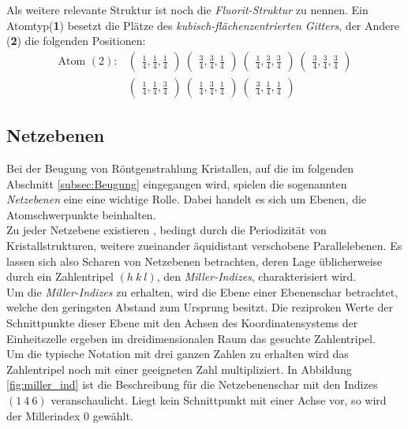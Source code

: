 Als weitere relevante Struktur ist noch die
\textit{Fluorit-Struktur} zu nennen.
Ein Atomtyp(\textbf{1}) besetzt die Plätze des
\textit{kubisch-flächenzentrierten Gitters},
der Andere (\textbf{2}) die folgenden
Positionen:
\begin{align}
\label{eqn:9*}
\text{Atom }(2) :&
\begin{pmatrix}
\frac{1}{4}, \frac{1}{4}, \frac{1}{4}
\end{pmatrix}\
\begin{pmatrix}
\frac{3}{4}, \frac{3}{4}, \frac{1}{4}
\end{pmatrix}\
\begin{pmatrix}
\frac{1}{4}, \frac{3}{4}, \frac{3}{4}
\end{pmatrix}\
\begin{pmatrix}
\frac{3}{4}, \frac{3}{4}, \frac{3}{4}
\end{pmatrix}\\
&\begin{pmatrix}
\frac{1}{4}, \frac{1}{4}, \frac{3}{4}
\end{pmatrix}\
\begin{pmatrix}
\frac{1}{4}, \frac{3}{4}, \frac{1}{4}
\end{pmatrix}\
\begin{pmatrix}
\frac{3}{4}, \frac{1}{4}, \frac{1}{4}
\end{pmatrix}\
\end{align}

\subsection{Netzebenen}
\label{subsec:netzebenen}
Bei der Beugung von Röntgenstrahlung Kristallen,
auf die im folgenden Abschnitt \ref{subsec:Beugung}
eingegangen wird, spielen die sogenannten \textit{Netzebenen}
eine eine wichtige Rolle. Dabei handelt es sich
um Ebenen, die Atomschwerpunkte beinhalten.\\
Zu jeder Netzebene existieren , bedingt durch die
Periodizität von Kristallstrukturen, weitere zueinander
äquidistant verschobene Parallelebenen.
Es lassen sich also Scharen von Netzebenen betrachten,
deren Lage üblicherweise durch ein Zahlentripel $(h \ k \ l)$,
den \textit{Miller-Indizes}, charakterisiert wird.\\
Um die \textit{Miller-Indizes} zu erhalten, wird die
Ebene einer Ebenenschar betrachtet, welche den geringsten
Abstand zum Ursprung besitzt. Die reziproken Werte
der Schnittpunkte dieser Ebene mit den Achsen des
Koordinatensystems der Einheitszelle ergeben im
dreidimensionalen Raum das gesuchte Zahlentripel.\\
Um die typische Notation mit drei ganzen Zahlen zu erhalten
wird das Zahlentripel noch mit einer geeigneten Zahl
multipliziert. In Abbildung \ref{fig:miller_ind}
ist die Beschreibung für die Netzebenenschar mit den
Indizes $(1 \ 4 \ 6)$ veranschaulicht.
Liegt kein Schnittpunkt mit einer
Achse vor, so wird der Millerindex $0$ gewählt.

